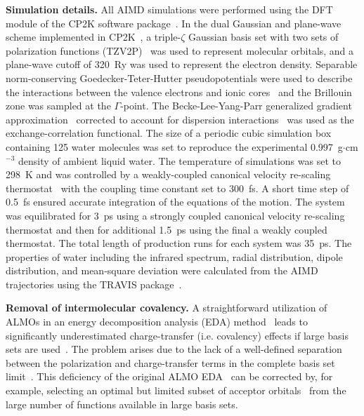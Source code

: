 \documentclass[journal=jacsat,manuscript=article]{achemso}
\begin{document}
\textbf{Simulation details.} All AIMD simulations were performed using the DFT module of the CP2K software package~\cite{www:cp2k}. 
In the dual Gaussian and plane-wave scheme implemented in CP2K~\cite{hutter2014cp2k}, a triple-$\zeta$ Gaussian basis set with two sets of polarization functions (TZV2P)~\cite{vandevondele2007gaussian} was used to represent molecular orbitals, and a plane-wave cutoff of 320~Ry was used to represent the electron density. 
Separable norm-conserving Goedecker-Teter-Hutter pseudopotentials were used to describe the interactions between the valence electrons and ionic cores~\cite{goedecker1996separable,krack2005pseudopotentials} and the Brillouin zone was sampled at the $\Gamma$-point. 
The Becke-Lee-Yang-Parr generalized gradient approximation~\cite{becke1988density, lee1988development} corrected to account for dispersion interactions~\cite{grimme2010consistent} was used as the exchange-correlation functional. 
The size of a periodic cubic simulation box containing 125 water molecules was set to reproduce the experimental 0.997~g$\cdot$cm$^{-3}$ density of ambient liquid water. 
The temperature of simulations was set to 298~K and was controlled by a weakly-coupled canonical velocity re-scaling thermostat~\cite{bussi2007canonical} with the coupling time constant set to 300~fs. 
A short time step of 0.5~fs ensured accurate integration of the equations of the motion. 
The system was equilibrated for 3~ps using a strongly coupled canonical velocity re-scaling thermostat and then for additional 1.5~ps using the final a weakly coupled thermostat. 
The total length of production runs for each system was 35~ps. 
The properties of water including the infrared spectrum, radial distribution, dipole distribution, and mean-square deviation were calculated from the AIMD trajectories using the TRAVIS package~\cite{brehm2012travis}.  

\textbf{Removal of intermolecular covalency.} A straightforward utilization of ALMOs in an energy decomposition analysis (EDA) method~\cite{khaliullin2007unravelling} leads to significantly underestimated charge-transfer (i.e. covalency) effects if large basis sets are used~\cite{horn2015polarization,lao2016energy}. 
The problem arises due to the lack of a well-defined separation between the polarization and charge-transfer terms in the complete basis set limit~\cite{misquitta2013charge,horn2015polarization}. 
This deficiency of the original ALMO EDA~\cite{khaliullin2007unravelling} can be corrected by, for example, selecting an optimal but limited subset of acceptor orbitals~\cite{horn2015polarization} from the large number of functions available in large basis sets. 
\end{document}
